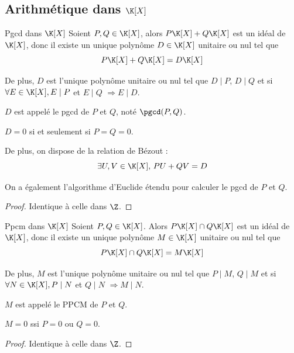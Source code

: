 \subsection{Arithmétique dans \texorpdfstring{$\K [X]$}{K[X]}}

\begin{theoreme}{Pgcd dans $\K[X]$}{}
    Soient $P, Q \in \K[X]$, alors $P\K[X] + Q \K[X] $ est un idéal de $\K[X]$, 
    donc il existe un unique polynôme $D \in \K[X]$ unitaire ou nul tel que
    $$P \K[X] + Q \K[X] = D \K[X]$$

    De plus, $D$ est l'unique polynôme unitaire ou nul tel que 
    $D \mid P$, $D \mid Q$ et si $\forall E \in \K[X], E \mid P$ et $E \mid Q$ $\Rightarrow E \mid D$.

    $D$ est appelé le pgcd de $P$ et $Q$, noté $\pgcd(P, Q)$.
\end{theoreme}

\begin{remarque}
    $D = 0$ si et seulement si $P = Q = 0$.

    De plus, on dispose de la relation de Bézout :
    $$\exists U, V \in \K[X], \, PU + QV = D$$

    On a également l'algorithme d'Euclide étendu pour calculer le pgcd de $P$ et $Q$.
\end{remarque}

\begin{proof}
    Identique à celle dans $\Z$. 
\end{proof}

\begin{theoreme}{Ppcm dans $\K[X]$}{}
    Soient $P, Q \in \K[X]$. Alors $P\K[X] \cap Q \K[X]$ est un idéal de 
    $\K[X]$, donc il existe un unique polynôme $M \in \K[X]$ unitaire ou nul tel que
    $$P \K[X] \cap Q \K[X] = M \K[X]$$

    De plus, $M$ est l'unique polynôme unitaire ou nul tel que
    $P \mid M$, $Q \mid M$ et si $\forall N \in \K[X], P \mid N$ et $Q \mid N$ $\Rightarrow M \mid N$.

    $M$ est appelé le PPCM de $P$ et $Q$. 
\end{theoreme}

\begin{remarque}
    $M = 0$ ssi $P = 0$ ou $Q = 0$.
\end{remarque}

\begin{proof}
    Identique à celle dans $\Z$.
\end{proof}

